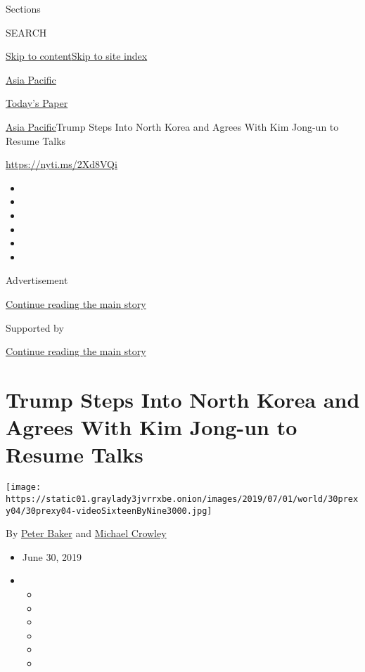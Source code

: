 Sections

SEARCH

\protect\hyperlink{site-content}{Skip to
content}\protect\hyperlink{site-index}{Skip to site index}

\href{https://www.nytimes3xbfgragh.onion/section/world/asia}{Asia
Pacific}

\href{https://myaccount.nytimes3xbfgragh.onion/auth/login?response_type=cookie\&client_id=vi}{}

\href{https://www.nytimes3xbfgragh.onion/section/todayspaper}{Today's
Paper}

\href{/section/world/asia}{Asia Pacific}\textbar{}Trump Steps Into North
Korea and Agrees With Kim Jong-un to Resume Talks

\url{https://nyti.ms/2Xd8VQi}

\begin{itemize}
\item
\item
\item
\item
\item
\item
\end{itemize}

Advertisement

\protect\hyperlink{after-top}{Continue reading the main story}

Supported by

\protect\hyperlink{after-sponsor}{Continue reading the main story}

\hypertarget{trump-steps-into-north-korea-and-agrees-with-kim-jong-un-to-resume-talks}{%
\section{Trump Steps Into North Korea and Agrees With Kim Jong-un to
Resume
Talks}\label{trump-steps-into-north-korea-and-agrees-with-kim-jong-un-to-resume-talks}}

\texttt{[image: https://static01.graylady3jvrrxbe.onion/images/2019/07/01/world/30prexy04/30prexy04-videoSixteenByNine3000.jpg]}

By \href{https://www.nytimes3xbfgragh.onion/by/peter-baker}{Peter Baker}
and \href{https://www.nytimes3xbfgragh.onion/by/michael-crowley}{Michael
Crowley}

\begin{itemize}
\item
  June 30, 2019
\item
  \begin{itemize}
  \item
  \item
  \item
  \item
  \item
  \item
  \end{itemize}
\end{itemize}

